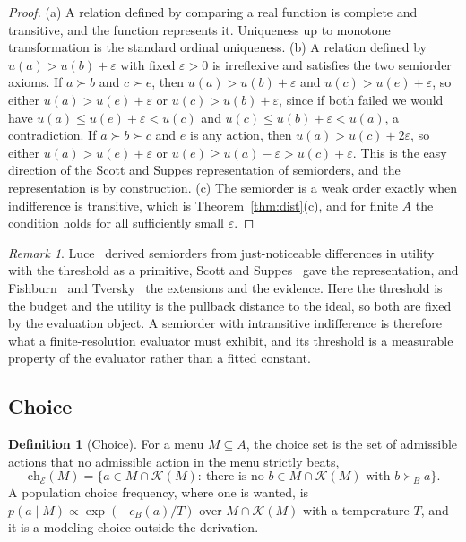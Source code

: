 \documentclass[11pt]{article}
\theoremstyle{definition}
\newtheorem{definition}{Definition}
\theoremstyle{remark}
\newtheorem*{remark}{Remark}
\newcommand{\Ev}{\mathcal{E}}
\newcommand{\K}{\mathcal{K}}
\begin{document}
\begin{proof}
(a) A relation defined by comparing a real function is complete and transitive, and the function represents it. Uniqueness up to monotone transformation is the standard ordinal uniqueness.
(b) A relation defined by $u(a)>u(b)+\varepsilon$ with fixed $\varepsilon>0$ is irreflexive and satisfies the two semiorder axioms. If $a\succ b$ and $c\succ e$, then $u(a)>u(b)+\varepsilon$ and $u(c)>u(e)+\varepsilon$, so either $u(a)>u(e)+\varepsilon$ or $u(c)>u(b)+\varepsilon$, since if both failed we would have $u(a)\le u(e)+\varepsilon<u(c)$ and $u(c)\le u(b)+\varepsilon<u(a)$, a contradiction. If $a\succ b\succ c$ and $e$ is any action, then $u(a)>u(c)+2\varepsilon$, so either $u(a)>u(e)+\varepsilon$ or $u(e)\ge u(a)-\varepsilon>u(c)+\varepsilon$. This is the easy direction of the Scott and Suppes representation of semiorders, and the representation is by construction.
(c) The semiorder is a weak order exactly when indifference is transitive, which is Theorem~\ref{thm:dist}(c), and for finite $A$ the condition holds for all sufficiently small $\varepsilon$.
\end{proof}

\begin{remark}
Luce~\cite{luce1956} derived semiorders from just-noticeable differences in utility with the threshold as a primitive, Scott and Suppes~\cite{scott1958} gave the representation, and Fishburn~\cite{fishburn1970} and Tversky~\cite{tversky1969} the extensions and the evidence.
Here the threshold is the budget and the utility is the pullback distance to the ideal, so both are fixed by the evaluation object.
A semiorder with intransitive indifference is therefore what a finite-resolution evaluator must exhibit, and its threshold is a measurable property of the evaluator rather than a fitted constant.
\end{remark}

\subsection{Choice}

\begin{definition}[Choice]
\label{def:choice}
For a menu $M\subseteq A$, the choice set is the set of admissible actions that no admissible action in the menu strictly beats,
\[
\mathrm{ch}_{\Ev}(M)=\bigl\{a\in M\cap\K(M):\ \text{there is no } b\in M\cap\K(M)\text{ with } b\succ_{B}a\bigr\}.
\]
A population choice frequency, where one is wanted, is $p(a\mid M)\propto\exp(-c_{B}(a)/T)$ over $M\cap\K(M)$ with a temperature $T$, and it is a modeling choice outside the derivation.
\end{definition}
\end{document}
